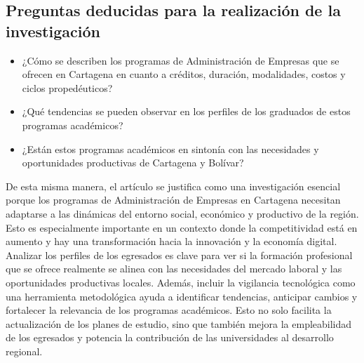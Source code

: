 \documentclass[letterpaper, 11pt]{report}
\begin{document}
\subsection*{Preguntas deducidas para la realización de la investigación}

\begin{itemize}
      \item ¿Cómo se describen los programas de Administración de Empresas que se ofrecen en Cartagena en cuanto a créditos, duración, modalidades, costos y ciclos propedéuticos?

      \item ¿Qué tendencias se pueden observar en los perfiles de los graduados de estos programas académicos?

      \item ¿Están estos programas académicos en sintonía con las necesidades y oportunidades productivas de Cartagena y Bolívar?

\end{itemize}

De esta misma manera, el artículo se justifica como una investigación esencial
porque los programas de Administración de Empresas en Cartagena necesitan
adaptarse a las dinámicas del entorno social, económico y productivo de la
región. Esto es especialmente importante en un contexto donde la competitividad
está en aumento y hay una transformación hacia la innovación y la economía
digital. Analizar los perfiles de los egresados es clave para ver si la
formación profesional que se ofrece realmente se alinea con las necesidades del
mercado laboral y las oportunidades productivas locales. Además, incluir la
vigilancia tecnológica como una herramienta metodológica ayuda a identificar
tendencias, anticipar cambios y fortalecer la relevancia de los programas
académicos. Esto no solo facilita la actualización de los planes de estudio,
sino que también mejora la empleabilidad de los egresados y potencia la
contribución de las universidades al desarrollo regional.

\printbibliography
\end{document}
